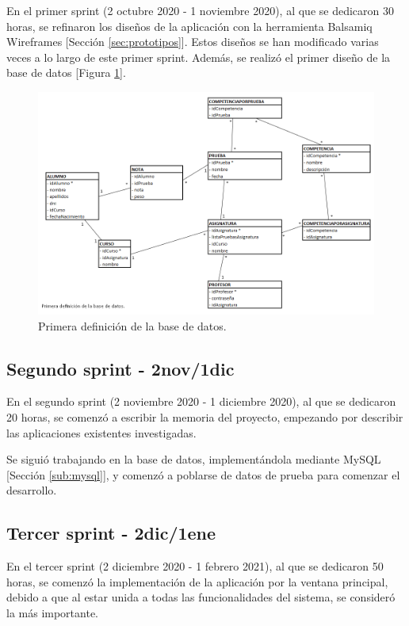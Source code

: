 En el primer sprint (2 octubre 2020 - 1 noviembre 2020), al que se dedicaron 30 horas, se refinaron los diseños de la aplicación con la herramienta Balsamiq Wireframes [Sección \ref{sec:prototipos}]. Estos diseños se han modificado varias veces a lo largo de este primer sprint. Además, se realizó el primer diseño de la base de datos [Figura \ref{Fig:db_definition1}].

\begin{figure}[h]
\centering\includegraphics[width=1\linewidth]{figs/DB_Definition_1.png}
\caption{Primera definición de la base de datos.}
\label{Fig:db_definition1}
\end{figure}

\subsection{Segundo sprint - 2nov/1dic}

En el segundo sprint (2 noviembre 2020 - 1 diciembre 2020), al que se dedicaron 20 horas, se comenzó a escribir la memoria del proyecto, empezando por describir las aplicaciones existentes investigadas.

Se siguió trabajando en la base de datos, implementándola mediante MySQL [Sección \ref{sub:mysql}], y comenzó a poblarse de datos de prueba para comenzar el desarrollo.


\subsection{Tercer sprint - 2dic/1ene}

En el tercer sprint (2 diciembre 2020 - 1 febrero 2021), al que se dedicaron 50 horas, se comenzó la implementación de la aplicación por la ventana principal, debido a que al estar unida a todas las funcionalidades del sistema, se consideró la más importante.

